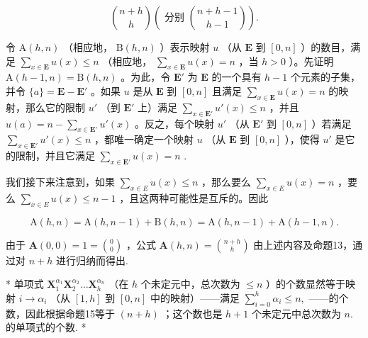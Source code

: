 \[
\binom {n + h} {h} \left(\text { 分别 } \binom {n + h - 1} {h - 1}\right).
\]

令 \(\mathrm{A}(h, n)\) （相应地， \(\mathrm{B}(h, n)\) ）表示映射 \(u\) （从 \(\mathbf{E}\) 到 \([0, n]\) ）的数目，满足 \(\sum_{x \in \mathbf{E}} u(x) \leqslant n\) （相应地， \(\sum_{x \in \mathbf{E}} u(x) = n\) ，当 \(h > 0\) ）。先证明 \(\mathrm{A}(h - 1, n) = \mathrm{B}(h, n)\) 。为此，令 \(\mathbf{E}'\) 为 \(\mathbf{E}\) 的一个具有 \(h - 1\) 个元素的子集，并令 \(\{a\} = \mathbf{E} - \mathbf{E}'\) 。如果 \(u\) 是从 \(\mathbf{E}\) 到 \([0, n]\) 且满足 \(\sum_{x \in \mathbf{E}} u(x) = n\) 的映射，那么它的限制 \(u'\) （到 \(\mathbf{E}'\) 上）满足 \(\sum_{x \in \mathbf{E}'} u'(x) \leqslant n\) ，并且 \(u(a) = n - \sum_{x \in \mathbf{E}'} u'(x)\) 。反之，每个映射 \(u'\) （从 \(\mathbf{E}'\) 到 \([0, n]\) ）若满足 \(\sum_{x \in \mathbf{E}'} u'(x) \leqslant n\) ，都唯一确定一个映射 \(u\) （从 \(\mathbf{E}\) 到 \([0, n]\) ），使得 \(u'\) 是它的限制，并且它满足 \(\sum_{x \in \mathbf{E}'} u(x) = n\) .

我们接下来注意到，如果 \(\sum_{x\in E}u(x)\leqslant n\) ，那么要么 \(\sum_{x\in E}u(x) = n\) ，要么 \(\sum_{x\in E}u(x)\leqslant n - 1\) ，且这两种可能性是互斥的。因此

\[
\mathrm{A} (h, n) = \mathrm{A} (h, n - 1) + \mathrm{B} (h, n) = \mathrm{A} (h, n - 1) + \mathrm{A} (h - 1, n).
\]

由于 \(\mathbf{A}(0,0) = 1 = \binom{0}{0}\) ，公式 \(\mathbf{A}(h,n) = \binom{n + h}{h}\) 由上述内容及命题13，通过对 \(n + h\) 进行归纳而得出.

* 单项式 \(\mathbf{X}_1^{\alpha_1}\mathbf{X}_2^{\alpha_2}\ldots \mathbf{X}_h^{\alpha_n}\) （在 \(h\) 个未定元中，总次数为 \(\leqslant n\) ）的个数显然等于映射 \(i\to \alpha_{i}\) （从 \([1,h]\) 到 \([0,n]\) 中的映射）——满足 \(\sum_{i = 0}^{h}\alpha_{i}\leqslant n,\) ——的个数，因此根据命题15等于 \((n + h)\) ；这个数也是 \(h + 1\) 个未定元中总次数为 \(n.\) 的单项式的个数. *

